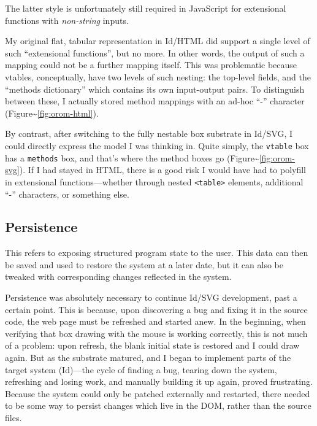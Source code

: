 The latter style is unfortunately still required in JavaScript for
extensional functions with \emph{non-string} inputs.

My original flat, tabular representation in Id{}/HTML did support a
single level of such ``extensional functions'', but no more. In other
words, the output of such a mapping could not be a further mapping
itself. This was problematic because vtables, conceptually, have two
levels of such nesting: the top-level fields, and the ``methods
dictionary'' which contains its own input-output pairs. To distinguish
between these, I actually stored method mappings with an ad-hoc ``-''
character (Figure\textasciitilde{}\ref{fig:orom-html}).

By contrast, after switching to the fully nestable box substrate in
Id{}/SVG, I could directly express the model I was thinking in. Quite
simply, the \texttt{vtable} box has a \texttt{methods} box, and that's
where the method boxes go (Figure\textasciitilde{}\ref{fig:orom-svg}).
If I had stayed in HTML, there is a good risk I would have had to
polyfill in extensional functions---whether through nested
\texttt{\textless{}table\textgreater{}} elements, additional ``-''
characters, or something else.

\hypertarget{persistence}{%
\subsection{Persistence}\label{persistence}}

This refers to exposing structured program state to the user. This data
can then be saved and used to restore the system at a later date, but it
can also be tweaked with corresponding changes reflected in the system.

Persistence was absolutely necessary to continue Id{}/SVG development,
past a certain point. This is because, upon discovering a bug and fixing
it in the source code, the web page must be refreshed and started anew.
In the beginning, when verifying that box drawing with the mouse is
working correctly, this is not much of a problem: upon refresh, the
blank initial state is restored and I could draw again. But as the
substrate matured, and I began to implement parts of the target system
(Id{})---the cycle of finding a bug, tearing down the system, refreshing
and losing work, and manually building it up again, proved frustrating.
Because the system could only be patched externally and restarted, there
needed to be some way to persist changes which live in the DOM, rather
than the source files.

